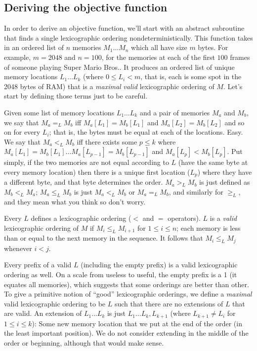 \documentclass[twocolumn]{article}
\begin{document}
\subsection{Deriving the objective function}

In order to derive an objective function, we'll start with an abstract
subroutine that finds a single lexicographic ordering
nondeterministically. This function takes in an ordered list of $n$
memories $M_1\ldots M_n$ which all have size $m$ bytes. For example,
$m = 2048$ and $n = 100$, for the memories at each of the first $100$
frames of someone playing Super Mario Bros.. It produces an ordered
list of unique memory locations $L_1 \ldots L_k$ (where $0 \leq L_i <
m$, that is, each is some spot in the 2048 bytes of RAM) that is a
{\em maximal} {\em valid} lexicographic ordering of $M$. Let's start
by defining those terms just to be careful.

Given some list of memory locations $L_1 \ldots L_k$ and a pair of
memories $M_a$ and $M_b$, we say that $M_a =_L M_b$ iff $M_a[L_1] =
M_b[L_1]$ and $M_a[L_2] = M_b[L_2]$ and so on for every $L_i$; that
is, the bytes must be equal at each of the locations. Easy. We say
that $M_a <_L M_b$ iff there exists some $p \leq k$ where $M_a[L_1] =
M_b[L_1] \ldots M_a[L_{p-1}] = M_b[L_{p-1}]$ and $M_a[L_p] <
M_b[L_p]$. Put simply, if the two memories are not equal according to
$L$ (have the same byte at every memory location) then there is a
unique first location ($L_p$) where they have a different byte, and
that byte determines the order. $M_a >_L M_b$ is just defined as $M_b <_L
M_a$; $M_a \leq_L M_b$ is just $M_a <_L M_b$ or $M_a =_L M_b$, and similarly
for $\geq_L$, and they mean what you think so don't worry.

Every $L$ defines a lexicographic ordering ($<$ and $=$ operators).
$L$ is a {\em valid} lexicographic ordering of $M$ if $M_i \leq_L M_{i + 1}$
for $1 \leq i \leq n$; each memory is less than or equal to the next
memory in the sequence. It follows that $M_i \leq_L M_j$ whenever $i < j$.

Every prefix of a valid $L$ (including the empty prefix) is a valid
lexicographic ordering as well. On a scale from useless to useful, the
empty prefix is a 1 (it equates all memories), which suggests that
some orderings are better than other. To give a primitive notion of
``good'' lexicographic orderings, we define a {\em maximal} valid
lexicographic ordering to be $L$ such that there are no extensions of
$L$ that are valid. An extension of $L_1 \ldots L_k$ is just $L_1
\ldots L_k, L_{k+1}$ (where $L_{k+1} \neq L_i$ for $1 \leq i \leq k$):
Some new memory location that we put at the end of the order (in the
least important position). We do not consider extending in the middle
of the order or beginning, although that would make sense.
\end{document}
